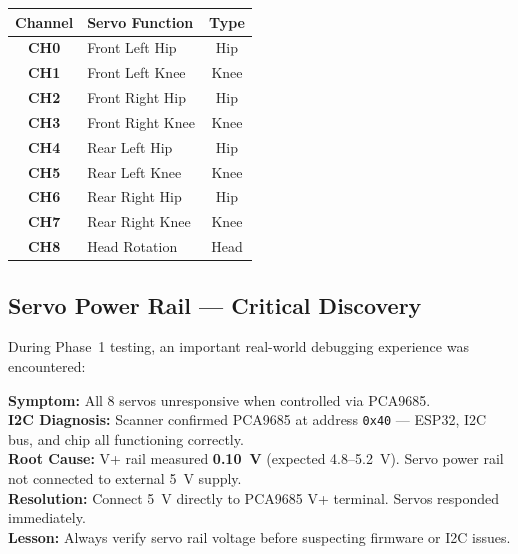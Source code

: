 \documentclass[12pt, a4paper]{article}
\renewcommand{\arraystretch}{1.3}
\begin{document}
\begin{center}
\renewcommand{\arraystretch}{1.4}
\begin{tabular}{|>{\bfseries}c|l|c|}
\hline
\rowcolor{myblue!15}\textbf{Channel} & \textbf{Servo Function} & \textbf{Type} \\
\hline
CH0 & Front Left Hip   & Hip  \\
\rowcolor{gray!8}
CH1 & Front Left Knee  & Knee \\
CH2 & Front Right Hip  & Hip  \\
\rowcolor{gray!8}
CH3 & Front Right Knee & Knee \\
CH4 & Rear Left Hip    & Hip  \\
\rowcolor{gray!8}
CH5 & Rear Left Knee   & Knee \\
CH6 & Rear Right Hip   & Hip  \\
\rowcolor{gray!8}
CH7 & Rear Right Knee  & Knee \\
CH8 & Head Rotation    & Head \\
\hline
\end{tabular}
\end{center}

\subsection{Servo Power Rail --- Critical Discovery}

During Phase~1 testing, an important real-world debugging experience was
encountered:

\begin{tcolorbox}[
  colback=myamber!10, colframe=myamber,
  arc=4pt, boxrule=0.5pt,
  colbacktitle=myamber, coltitle=white,
  title={\bfseries Critical Finding: PCA9685 V+ Power Rail Issue}
]
\textbf{Symptom:} All 8 servos unresponsive when controlled via PCA9685.\\[4pt]
\textbf{I2C Diagnosis:} Scanner confirmed PCA9685 at address \texttt{0x40} ---
ESP32, I2C bus, and chip all functioning correctly.\\[4pt]
\textbf{Root Cause:} V+ rail measured \textbf{0.10~V} (expected 4.8--5.2~V).
Servo power rail not connected to external 5~V supply.\\[4pt]
\textbf{Resolution:} Connect 5~V directly to PCA9685 V+ terminal. Servos
responded immediately.\\[4pt]
\textbf{Lesson:} Always verify servo rail voltage before suspecting firmware
or I2C issues.
\end{tcolorbox}
\end{document}
